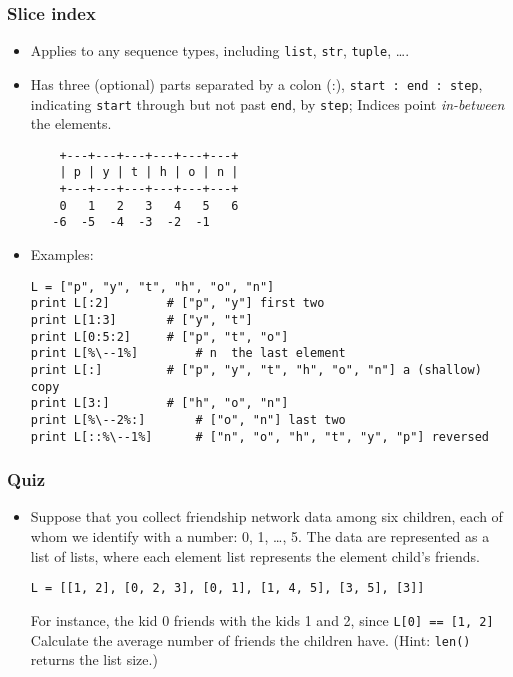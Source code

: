 \documentclass{beamer}
\begin{document}
\begin{frame}[fragile]
\frametitle{Slice index}
\begin{itemize}
\item Applies to any sequence types, including
      \lstinline{list}, \lstinline{str},
      \lstinline{tuple}, \ldots.
\item Has three (optional) parts separated 
      by a colon (:),
      \lstinline{start : end : step}, indicating
      \lstinline{start} through but not past
      \lstinline{end}, by \lstinline{step}; Indices
      point \emph{in-between} the elements.
\begin{lstlisting}
    +---+---+---+---+---+---+
    | p | y | t | h | o | n |
    +---+---+---+---+---+---+
    0   1   2   3   4   5   6
   -6  -5  -4  -3  -2  -1
\end{lstlisting} 
\item Examples:
\begin{lstlisting}[escapechar=\%]
L = ["p", "y", "t", "h", "o", "n"]
print L[:2]        # ["p", "y"] first two
print L[1:3]       # ["y", "t"]
print L[0:5:2]     # ["p", "t", "o"]
print L[%\--1%]        # n  the last element
print L[:]         # ["p", "y", "t", "h", "o", "n"] a (shallow) copy
print L[3:]        # ["h", "o", "n"]
print L[%\--2%:]       # ["o", "n"] last two
print L[::%\--1%]      # ["n", "o", "h", "t", "y", "p"] reversed
\end{lstlisting}
\end{itemize}
\end{frame}

\begin{frame}[fragile]
\frametitle{Quiz}
\begin{itemize}
\item<1-> Suppose that you collect
      friendship network data among six children,
      each of whom we identify with a number: 0, 1,
      \ldots, 5.
      The data are represented as a list of lists,
      where each element list
      represents the element child's friends.
\begin{lstlisting}
L = [[1, 2], [0, 2, 3], [0, 1], [1, 4, 5], [3, 5], [3]]
\end{lstlisting}
      For instance, the kid 0 friends with
      the kids 1 and 2, since
      \lstinline{L[0] == [1, 2]}
      Calculate the average number of friends
      the children have. (Hint: \lstinline{len()}
      returns the list size.)
\end{itemize}
\end{frame}
\end{document}
